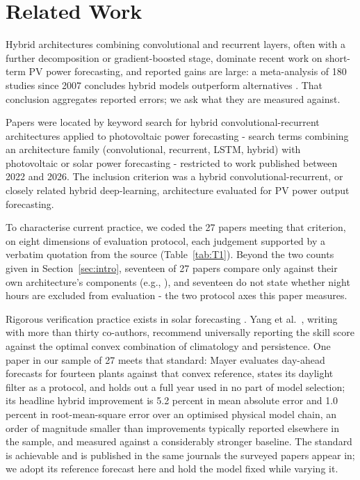 \section{Related Work}
\label{sec:related}

Hybrid architectures combining convolutional and recurrent layers,
often with a further decomposition or gradient-boosted stage, dominate
recent work on short-term PV power forecasting, and reported gains are
large: a meta-analysis of 180 studies since 2007 concludes hybrid
models outperform alternatives \cite{nguyenmusgens2021drives}. That
conclusion aggregates reported errors; we ask what they are measured
against.

Papers were located by keyword search for hybrid convolutional-recurrent
architectures applied to photovoltaic power forecasting - search terms
combining an architecture family (convolutional, recurrent, LSTM,
hybrid) with photovoltaic or solar power forecasting - restricted to
work published between 2022 and 2026. The inclusion criterion was a
hybrid convolutional-recurrent, or closely related hybrid
deep-learning, architecture evaluated for PV power output forecasting.

To characterise current practice, we coded the 27 papers meeting that
criterion, on eight dimensions of evaluation protocol, each judgement
supported by a verbatim quotation from the source (Table~\ref{tab:T1}).
Beyond the two counts
given in Section~\ref{sec:intro}, seventeen of 27 papers compare only
against their own architecture's components (e.g.,
\cite{li2022eemdssalstm, abumohsen2024cnnlstmrf}), and seventeen do
not state whether night hours are excluded from evaluation - the two
protocol axes this paper measures.



Rigorous verification practice exists in solar forecasting
\cite{yang2020verification, yang2019ropes}. Yang et
al.~\cite{yang2020verification}, writing with more than thirty
co-authors, recommend universally reporting the skill score against
the optimal convex combination of climatology and persistence. One
paper in our sample of 27 meets that standard: Mayer
\cite{mayer2022physmlhybrid} evaluates day-ahead forecasts for
fourteen plants against that convex reference, states its daylight
filter as a protocol, and holds out a full year used in no part of
model selection; its headline hybrid improvement is 5.2 percent in
mean absolute error and 1.0 percent in root-mean-square error over an
optimised physical model chain, an order of magnitude smaller than
improvements typically reported elsewhere in the sample, and measured
against a considerably stronger baseline. The standard is achievable
and is published in the same journals the surveyed papers appear in;
we adopt its reference forecast here and hold the model fixed while
varying it.

